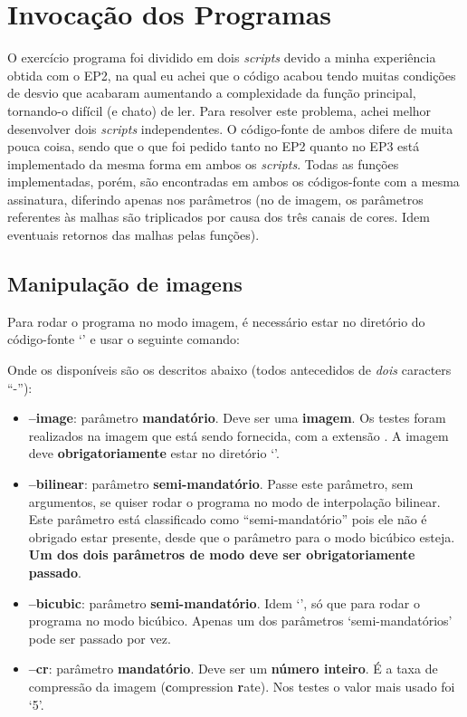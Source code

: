 \documentclass[11pt]{article}
\begin{document}
\pagebreak

\section{Invocação dos Programas}

\indent\indent O exercício programa foi dividido em dois \textit{scripts} devido a minha experiência obtida com o EP2, na qual eu achei que o código acabou tendo muitas condições de desvio
que acabaram aumentando a complexidade da função principal, tornando-o difícil (e chato) de ler. Para resolver este problema, achei melhor desenvolver dois \textit{scripts} independentes. O código-fonte
de ambos difere de muita pouca coisa, sendo que o que foi pedido tanto no EP2 quanto no EP3 está implementado da mesma forma em ambos os \textit{scripts}. Todas as funções implementadas, porém, são encontradas
em ambos os códigos-fonte com a mesma assinatura, diferindo apenas nos parâmetros (no de imagem, os parâmetros referentes às malhas são triplicados por causa dos três canais de cores. Idem eventuais retornos das malhas
pelas funções).

\subsection{Manipulação de imagens}

\indent\indent Para rodar o programa no modo imagem, é necessário estar no diretório do código-fonte `{}' e usar o seguinte comando:

\begin{flushleft}
  {}
\end{flushleft}

Onde os {} disponíveis são os descritos abaixo (todos antecedidos de \textit{dois} caracters ``-''):


\begin{itemize}
  \item \textbf{--image}: parâmetro \textbf{mandatório}. Deve ser uma \textbf{imagem}. Os testes foram realizados na imagem que está sendo fornecida, com a extensão {}. A
  imagem deve \textbf{obrigatoriamente} estar no diretório `{}'.
  \item \textbf{--bilinear}: parâmetro \textbf{semi-mandatório}. Passe este parâmetro, sem argumentos, se quiser rodar o programa no modo de interpolação bilinear. Este
  parâmetro está classificado como ``semi-mandatório'' pois ele não é obrigado estar presente, desde que o parâmetro para o modo bicúbico esteja. \textbf{Um dos dois parâmetros de modo
  deve ser obrigatoriamente passado}.
  \item \textbf{--bicubic}: parâmetro \textbf{semi-mandatório}. Idem `{}', só que para rodar o programa no modo bicúbico. Apenas um dos parâmetros `semi-mandatórios' pode ser passado por vez.
  \item \textbf{--cr}: parâmetro \textbf{mandatório}. Deve ser um \textbf{número inteiro}. É a taxa de compressão da imagem (\textbf{c}ompression \textbf{r}ate). Nos testes o valor mais usado foi `5'.
\end{itemize}
\end{document}
